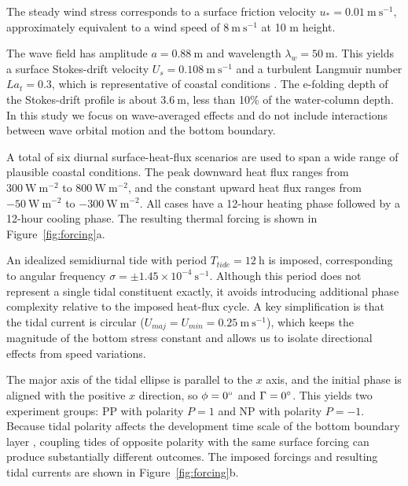 \documentclass[draft]{agujournal2019}
\let\cite\shortcite
\begin{document}
The steady wind stress corresponds to a surface friction velocity $u_* = 0.01\ \mathrm{m\ s^{-1}}$, approximately equivalent to a wind speed of $8\ \mathrm{m\ s^{-1}}$ at 10 m height.

The wave field has amplitude $a=0.88\ \mathrm{m}$ and wavelength $\lambda_w=50\ \mathrm{m}$. This yields a surface Stokes-drift velocity $U_s=0.108\ \mathrm{m\ s^{-1}}$ and a turbulent Langmuir number $La_{t}=0.3$, which is representative of coastal conditions \cite{Belcher2012}. The e-folding depth of the Stokes-drift profile is about $3.6\ \mathrm{m}$, less than 10\% of the water-column depth. In this study we focus on wave-averaged effects and do not include interactions between wave orbital motion and the bottom boundary.

A total of six diurnal surface-heat-flux scenarios are used to span a wide range of plausible coastal conditions. The peak downward heat flux ranges from $300\ \mathrm{W\ m^{-2}}$ to $800\ \mathrm{W\ m^{-2}}$, and the constant upward heat flux ranges from $-50\ \mathrm{W\ m^{-2}}$ to $-300\ \mathrm{W\ m^{-2}}$. All cases have a 12-hour heating phase followed by a 12-hour cooling phase. The resulting thermal forcing is shown in Figure~\ref{fig:forcing}a.

An idealized semidiurnal tide with period $T_{tide}=12\ \mathrm{h}$ is imposed, corresponding to angular frequency $\sigma=\pm1.45\times10^{-4}\ \mathrm{s^{-1}}$. Although this period does not represent a single tidal constituent exactly, it avoids introducing additional phase complexity relative to the imposed heat-flux cycle. A key simplification is that the tidal current is circular ($U_{maj}=U_{min}=0.25\ \mathrm{m\ s^{-1}}$), which keeps the magnitude of the bottom stress constant and allows us to isolate directional effects from speed variations.

The major axis of the tidal ellipse is parallel to the $x$ axis, and the initial phase is aligned with the positive $x$ direction, so $\phi=0\degree$ and $\Gamma=0\degree$. This yields two experiment groups: PP with polarity $P=1$ and NP with polarity $P=-1$. Because tidal polarity affects the development time scale of the bottom boundary layer \cite{Simpson2009}, coupling tides of opposite polarity with the same surface forcing can produce substantially different outcomes. The imposed forcings and resulting tidal currents are shown in Figure~\ref{fig:forcing}b.
\end{document}
